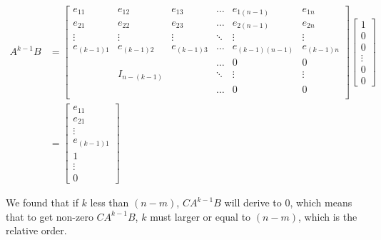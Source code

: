 \documentclass[12pt]{article}
\begin{document}
  \begin{equation}
    \begin{split}
      A^{k-1}B &=
      \begin{bmatrix}
      e_{11} & e_{12} & e_{13} & \dots & e_{1(n-1)} & e_{1n}   \\
      e_{21} & e_{22} & e_{23} & \dots  & e_{2(n-1)} & e_{2n} \\
      \vdots & \vdots & \vdots & \ddots & \vdots   & \vdots \\
      e_{(k-1)1} & e_{(k-1)2} & e_{(k-1)3} & \dots  & e_{(k-1)(n-1)} & e_{(k-1)n} \\
             &        &        & \dots  & 0        & 0      \\
             & I_{n-(k-1)} &        & \ddots  & \vdots        & \vdots      \\
             &        &        & \dots  & 0        & 0      \\
      \end{bmatrix}
      \begin{bmatrix}
      1 \\ 0 \\ 0 \\ \vdots \\ 0 \\ 0
      \end{bmatrix} \\
      &=
      \begin{bmatrix}
      e_{11} \\ e_{21} \\ \vdots \\ e_{(k-1)1} \\ 1 \\ \vdots \\ 0
      \end{bmatrix}
    \end{split}
  \end{equation}

  We found that if $k$ less than $(n-m)$, $CA^{k-1}B$ will derive to $0$, which means that to get non-zero $CA^{k-1}B$, $k$ must larger or equal to $(n-m)$, which is the relative order.
\end{document}
